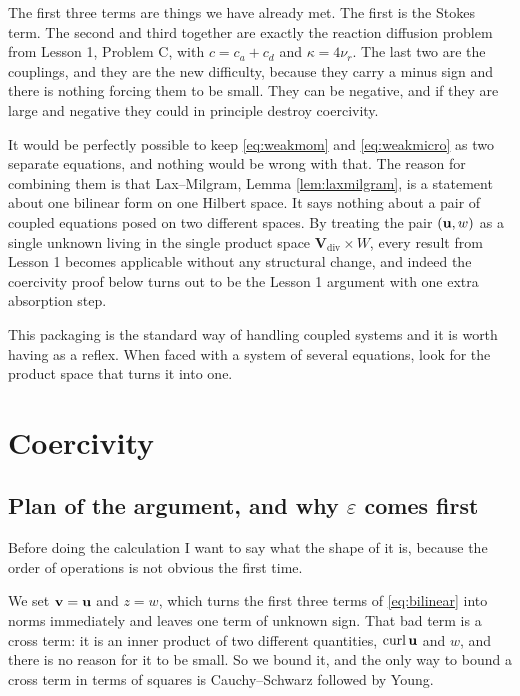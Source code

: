 \documentclass[11pt,a4paper]{article}
\begin{document}
The first three terms are things we have already met. The first is the Stokes
term. The second and third together are exactly the reaction diffusion problem
from Lesson 1, Problem C, with $c = c_{a} + c_{d}$ and $\kappa = 4\nu_{r}$. The
last two are the couplings, and they are the new difficulty, because they carry
a minus sign and there is nothing forcing them to be small. They can be
negative, and if they are large and negative they could in principle destroy
coercivity.

\begin{remark}
It would be perfectly possible to keep \eqref{eq:weakmom} and
\eqref{eq:weakmicro} as two separate equations, and nothing would be wrong with
that. The reason for combining them is that Lax--Milgram, Lemma
\ref{lem:laxmilgram}, is a statement about one bilinear form on one Hilbert
space. It says nothing about a pair of coupled equations posed on two different
spaces. By treating the pair $(\mathbf{u}, w)$ as a single unknown living in the single
product space $\mathbf{V}_{\mathrm{div}} \times W$, every result from Lesson 1
becomes applicable without any structural change, and indeed the coercivity
proof below turns out to be the Lesson 1 argument with one extra absorption
step.

This packaging is the standard way of handling coupled systems and it is worth
having as a reflex. When faced with a system of several equations, look for the
product space that turns it into one.
\end{remark}

\section{Coercivity}

\subsection{Plan of the argument, and why $\varepsilon$ comes first}

Before doing the calculation I want to say what the shape of it is, because the
order of operations is not obvious the first time.

We set $\mathbf{v} = \mathbf{u}$ and $z = w$, which turns the first three terms of
\eqref{eq:bilinear} into norms immediately and leaves one term of unknown sign.
That bad term is a cross term: it is an inner product of two different
quantities, $\operatorname{curl} \mathbf{u}$ and $w$, and there is no reason for it to be small. So
we bound it, and the only way to bound a cross term in terms of squares is
Cauchy--Schwarz followed by Young.
\end{document}

